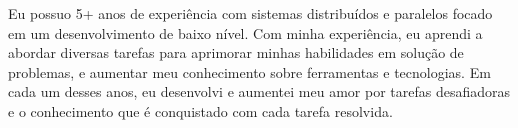 

\begin{cvparagraph}

    Eu possuo 5+ anos de experiência com sistemas distribuídos e paralelos
    focado em um desenvolvimento de baixo nível. Com minha experiência, eu
    aprendi a abordar diversas tarefas para aprimorar minhas habilidades em
    solução de problemas, e aumentar meu conhecimento sobre ferramentas e
    tecnologias. Em cada um desses anos, eu desenvolvi e aumentei meu amor por
    tarefas desafiadoras e o conhecimento que é conquistado com cada tarefa
    resolvida.

\end{cvparagraph}
